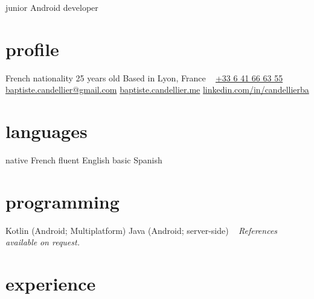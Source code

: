\documentclass[]{friggeri-cv}
\begin{document}
{junior Android developer}

\begin{aside}
    \section{profile}
    French nationality
    25 years old
    Based in Lyon, France
    ~
    \href{tel:0033641666355}{+33 6 41 66 63 55}
    \href{mailto:baptiste.candellier@gmail.com}{baptiste.candellier@gmail.com}
    \href{https://baptiste.candellier.me}{baptiste.candellier.me}
    \href{https://www.linkedin.com/in/candellierba/}{linkedin.com/in/candellierba}
    \section{languages}
    native French
    fluent English
    basic Spanish
    \section{programming}
    Kotlin (Android; Multiplatform)
    Java (Android; server-side)
    ~
    \textit{References available}
    \textit{on request.}
\end{aside}

\section{experience}
\end{document}
